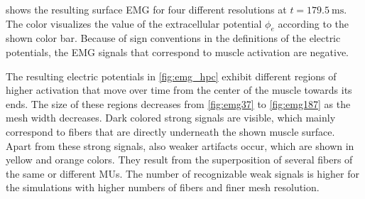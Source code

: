  shows the resulting surface EMG for four different resolutions at $t=\SI{179.5}{\ms}$. The color visualizes the value of the extracellular potential $\phi_e$ according to the shown color bar. Because of sign conventions in the definitions of the electric potentials, the EMG signals that correspond to muscle activation are negative.

The resulting electric potentials in \cref{fig:emg_hpc} exhibit different regions of higher activation that move over time from the center of the muscle towards its ends. The size of these regions decreases from \cref{fig:emg37} to \cref{fig:emg187} as the mesh width decreases. 
Dark colored strong signals are visible, which mainly correspond to fibers that are directly underneath the shown muscle surface.
Apart from these strong signals, also weaker artifacts occur, which are shown in yellow and orange colors. They result from the superposition of several fibers of the same or different MUs. The number of recognizable weak signals is higher for the simulations with higher numbers of fibers and finer mesh resolution.

